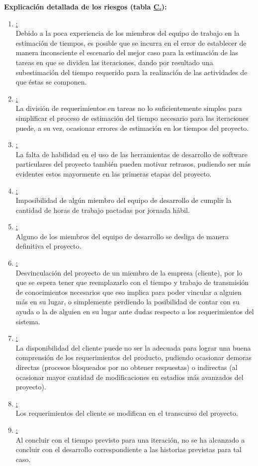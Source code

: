 \documentclass[a4paper, 12pt,twoside]{report}  %
\numberwithin{equation}{subsection} %
\begin{document}
\textbf{Explicación detallada de los riesgos (tabla \hyperref[tabla_riesgos]{C.\tempTblRiesgos}):}
\begin{enumerate}
	\item \underline{:}\\
	Debido a la poca experiencia de los miembros del equipo de trabajo en la estimación de tiempos, es posible que se incurra en el error de establecer de manera inconsciente el escenario del mejor caso para la estimación de las tareas en que se dividen las iteraciones, dando por resultado una subestimación del tiempo requerido para la realización de las actividades de que éstas se componen.
	\item \underline{:}\\
	La división de requerimientos en tareas no lo suficientemente simples para simplificar el proceso de estimación del tiempo necesario para las iteraciones puede, a su vez, ocasionar errores de estimación en los tiempos del proyecto.
	\item \underline{:}\\
	La falta de habilidad en el uso de las herramientas de desarrollo de software particulares del proyecto también pueden motivar retrasos, pudiendo ser más evidentes estos mayormente en las primeras etapas del proyecto.
	\item \underline{:}\\
	Imposibilidad de algún miembro del equipo de desarrollo de cumplir la cantidad de horas de trabajo pactadas por jornada hábil.
	\item \underline{:}\\
	Alguno de los miembros del equipo de desarrollo se desliga de manera definitiva el proyecto.
	\item \underline{:}\\
	Desvinculación del proyecto de un miembro de la empresa (cliente), por lo que se espera tener que reemplazarlo con el tiempo y trabajo de transmisión de conocimientos necesarios que eso implica para poder vincular a alguien más en su lugar, o simplemente perdiendo la posibilidad de contar con su ayuda o la de alguien en su lugar ante dudas respecto a los requerimientos del sistema.
	\item \underline{:}\\
	La disponibilidad del cliente puede no ser la adecuada para lograr una buena comprensión de los requerimientos del producto, pudiendo ocasionar demoras directas (procesos bloqueados por no obtener respuestas) o indirectas (al ocasionar mayor cantidad de modificaciones en estadios más avanzados del proyecto).
	\item \underline{:}\\
	Los requerimientos del cliente se modifican en el transcurso del proyecto.
	\item \underline{:}\\
	Al concluir con el tiempo previsto para una iteración, no se ha alcanzado a concluir con el desarrollo correspondiente a las historias previstas para tal caso.
\end{enumerate}
\end{document}
